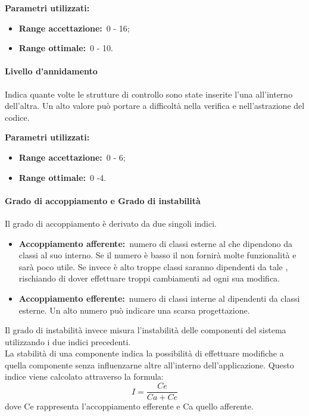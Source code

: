 				\textbf{Parametri utilizzati:}
				\begin{itemize}
					\item \textbf{Range accettazione:}\ 0 - 16;
					\item \textbf{Range ottimale:}\ 0 - 10.
				\end{itemize}
			\paragraph{Livello d'annidamento}
				\label{sec:3.7.3.4}
				Indica quante volte le strutture di controllo sono state inserite l'una all'interno dell'altra. Un alto valore può portare a difficoltà nella verifica e nell'astrazione del codice.
				
				\textbf{Parametri utilizzati:}
				\begin{itemize}
					\item \textbf{Range accettazione:}\ 0 - 6;
					\item \textbf{Range ottimale:}\ 0 -4.
				\end{itemize}
			\paragraph{Grado di accoppiamento e Grado di instabilità}
				\label{sec:3.7.3.5}
				Il grado di accoppiamento è derivato da due singoli indici.
				\begin{itemize}
					\item \textbf{Accoppiamento afferente:}\ numero di classi esterne al  che dipendono da classi al suo interno. Se il numero è basso il  non fornirà molte funzionalità e sarà poco utile. Se invece è alto troppe classi saranno dipendenti da tale , rischiando di dover effettuare troppi cambiamenti ad ogni sua modifica.
					
					\item \textbf{Accoppiamento efferente:}\ numero di classi interne al  dipendenti da classi esterne. Un alto numero può indicare una scarsa progettazione.
					
				\end{itemize}
				Il grado di instabilità invece misura l'instabilità delle componenti del sistema utilizzando i due indici precedenti. \\
				La stabilità di una componente indica la possibilità di effettuare modifiche a quella componente senza influenzarne altre all'interno dell'applicazione. Questo indice viene calcolato attraverso la formula:
				\[I=\frac{Ce}{Ca+Ce}\]
				dove Ce rappresenta l'accoppiamento efferente e Ca quello afferente.
				
